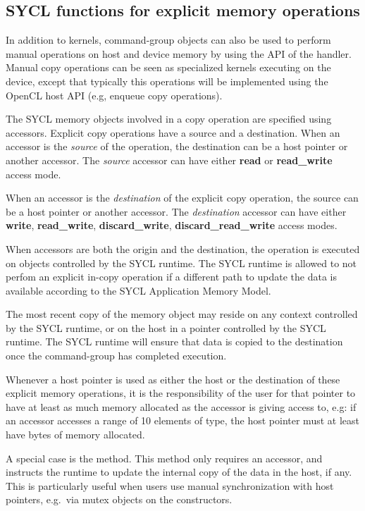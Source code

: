 \subsection{SYCL functions for explicit memory operations}
\label{subsec:explicitmemory}

In addition to \glspl{kernel}, \gls{command-group} objects can also be used to
perform manual operations on host and device memory by using the 
 API of the \gls{handler}.
Manual copy operations can be seen as specialized kernels executing on the 
device, except that typically this operations will be implemented using the
OpenCL host API (e.g, enqueue copy operations).

The SYCL memory objects involved in a copy operation are specified using
accessors.
Explicit copy operations have a source and a destination. 
When an accessor is the \textit{source} of the operation, the destination can be 
a host pointer or another accessor. 
The \textit{source} accessor can have either  \textbf{read} or \textbf{read\_write} access 
mode. 

When an accessor is the \textit{destination} of the explicit copy operation,
the source can be a host pointer or another accessor.
The \textit{destination} accessor can have either 
\textbf{write}, \textbf{read\_write}, \textbf{discard\_write}, 
\textbf{discard\_read\_write} access modes.

When accessors are both the origin and the destination,
the operation is executed on objects controlled by the SYCL runtime.
The SYCL runtime is allowed to not perfom an explicit in-copy operation
if a different path to update the data is available according to
the SYCL Application Memory Model.

The most recent copy of the memory object may reside on any context controlled
by the SYCL runtime, or on the host in a pointer controlled by the
SYCL runtime.  The SYCL runtime will ensure that data is copied to the destination
once the \gls{command-group} has completed execution.

Whenever a host pointer is used as either the host or the destination of these
explicit memory operations, it is the responsibility
of the user for that pointer to have at least as much memory allocated as
the accessor is giving access to, e.g: if an accessor accesses a range
of 10 elements of  type, the host pointer must at least have 
 bytes of memory allocated.

A special case is the  method. 
This method only requires an accessor, and instructs the runtime to update
the internal copy of the data in the host, if any. This is particularly
useful when users use manual synchronization with host pointers, e.g.\ 
via mutex objects on the  constructors.


